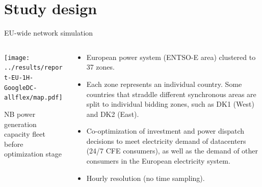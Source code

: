 \section{Study design}

\begin{frame}{EU-wide network simulation}

  \begin{columns}[T]
  \begin{column}{10cm}

  \centering
  \texttt{[image: ../results/report-EU-1H-GoogleDC-allflex/map.pdf]}

  {\scriptsize
  NB power generation capacity fleet before optimization stage\\
  }

  \end{column}

  \begin{column}{6cm}
  {\small
  \begin{itemize}
  \vspace{-.1cm}
  \item European power system (ENTSO-E area) clustered to \alert{37 zones}.
  \item Each zone represents an individual country. Some countries
  that straddle different synchronous areas are split to individual
  bidding zones, such as DK1 (West) and DK2 (East).
  \item \alert{Co-optimization} of investment and power dispatch
  decisions to meet electricity demand of datacenters (24/7 CFE consumers), as well as the demand of other
  consumers in the European electricity system. 
  \item \alert{Hourly resolution} (no time sampling).
  
  \end{itemize}
  }

  \end{column}
  \end{columns}

\end{frame}


